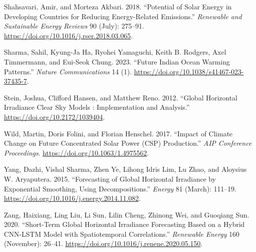 \documentclass[
  letterpaper,
  DIV=11,
  numbers=noendperiod]{scrartcl}
\newlength{\cslhangindent}
\newlength{\cslentryspacingunit} %
\newenvironment{CSLReferences}[2] %
 {%
  \setlength{\parindent}{0pt}
  \ifodd #1
  \let\oldpar\par
  \def\par{\hangindent=\cslhangindent\oldpar}
  \fi
  \setlength{\parskip}{#2\cslentryspacingunit}
 }%
 {}
\begin{document}
\begin{CSLReferences}{1}{0}
\leavevmode{}%
Shahsavari, Amir, and Morteza Akbari. 2018. {``Potential of Solar Energy
in Developing Countries for Reducing Energy-Related Emissions.''}
\emph{Renewable and Sustainable Energy Reviews} 90 (July): 275--91.
\url{https://doi.org/10.1016/j.rser.2018.03.065}.

\leavevmode{}%
Sharma, Sahil, Kyung-Ja Ha, Ryohei Yamaguchi, Keith B. Rodgers, Axel
Timmermann, and Eui-Seok Chung. 2023. {``Future Indian Ocean Warming
Patterns.''} \emph{Nature Communications} 14 (1).
\url{https://doi.org/10.1038/s41467-023-37435-7}.

\leavevmode{}%
Stein, Joshua, Clifford Hansen, and Matthew Reno. 2012. {``Global
Horizontal Irradiance Clear Sky Models : Implementation and Analysis.''}
\url{https://doi.org/10.2172/1039404}.

\leavevmode{}%
Wild, Martin, Doris Folini, and Florian Henschel. 2017. {``Impact of
Climate Change on Future Concentrated Solar Power (CSP) Production.''}
\emph{AIP Conference Proceedings}.
\url{https://doi.org/10.1063/1.4975562}.

\leavevmode{}%
Yang, Dazhi, Vishal Sharma, Zhen Ye, Lihong Idris Lim, Lu Zhao, and
Aloysius W. Aryaputera. 2015. {``Forecasting of Global Horizontal
Irradiance by Exponential Smoothing, Using Decompositions.''}
\emph{Energy} 81 (March): 111--19.
\url{https://doi.org/10.1016/j.energy.2014.11.082}.

\leavevmode{}%
Zang, Haixiang, Ling Liu, Li Sun, Lilin Cheng, Zhinong Wei, and Guoqiang
Sun. 2020. {``Short-Term Global Horizontal Irradiance Forecasting Based
on a Hybrid CNN-LSTM Model with Spatiotemporal Correlations.''}
\emph{Renewable Energy} 160 (November): 26--41.
\url{https://doi.org/10.1016/j.renene.2020.05.150}.

\end{CSLReferences}
\end{document}
